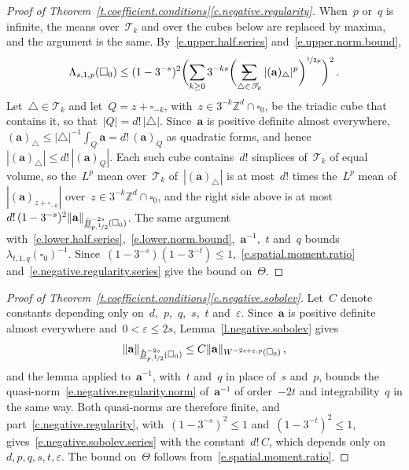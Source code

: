 \documentclass[11pt,letterpaper]{article}
\makeatletter
\numberwithin{equation}{section}
\theoremstyle{definition}
\newcommand{\Zd}{\mathbb{Z}^d}
\renewcommand{\a}{\mathbf{a}}
\newcommand{\eps}{\varepsilon}
\newcommand{\nf}{\nicefrac}
\newcommand{\cu}{\square}
\DeclarePairedDelimiter{\norm}{\lVert}{\rVert}
\newcommand{\avsum}{\mathop{\mathpalette\avsuminner\relax}\displaylimits}
\newcommand\avsuminner[2]{%
	{\sbox0{$\m@th#1\sum$}%
		\vphantom{\usebox0}%
		\ooalign{%
			\hidewidth
			\smash{\,\rule[.23em]{8.8pt}{1.1pt} \relax}%
			\hidewidth\cr
			$\m@th#1\sum$\cr
		}%
	}%
}
\makeatother
\begin{document}
\begin{proof}[Proof of Theorem~\ref{t.coefficient.conditions}\ref{c.negative.regularity}]
When~$p$ or~$q$ is infinite, the means over~$\mathscr T_k$ and over the cubes below are replaced by maxima, and the argument is the same. By~\eqref{e.upper.half.series} and~\eqref{e.upper.norm.bound},
\begin{equation*}
	\Lambda_{s,1,p}(\cu_0)\leq(1-3^{-s})^2\biggl(\sum_{k\geq0}3^{-ks}\biggl(\avsum_{\triangle\in\mathscr T_k}|(\a)_\triangle|^p\biggr)^{\nf1{2p}}\biggr)^2\,.
\end{equation*}
Let~$\triangle\in\mathscr T_k$ and let~$Q=z+\cu_{-k}$, with~$z\in3^{-k}\Zd\cap\cu_0$, be the triadic cube that contains it, so that~$|Q|=d!\,|\triangle|$. Since~$\a$ is positive definite almost everywhere,~$(\a)_\triangle\leq|\triangle|^{-1}\int_Q\a=d!\,(\a)_Q$ as quadratic forms, and hence~$|(\a)_\triangle|\leq d!\,|(\a)_Q|$. Each such cube contains~$d!$ simplices of~$\mathscr T_k$ of equal volume, so the~$L^p$ mean over~$\mathscr T_k$ of~$|(\a)_\triangle|$ is at most~$d!$ times the~$L^p$ mean of~$|(\a)_{z+\cu_{-k}}|$ over~$z\in3^{-k}\Zd\cap\cu_0$, and the right side above is at most~$d!\,(1-3^{-s})^2\norm{\a}_{\mathring{\underline B}^{-2s}_{p,\nf12}(\cu_0)}$. The same argument with~\eqref{e.lower.half.series},~\eqref{e.lower.norm.bound},~$\a^{-1}$,~$t$ and~$q$ bounds~$\lambda_{t,1,q}(\cu_0)^{-1}$. Since~$(1-3^{-s})(1-3^{-t})\leq1$,~\eqref{e.spatial.moment.ratio} and~\eqref{e.negative.regularity.series} give the bound on~$\Theta$.
\end{proof}

\begin{proof}[Proof of Theorem~\ref{t.coefficient.conditions}\ref{c.negative.sobolev}]
Let~$C$ denote constants depending only on~$d$,~$p$,~$q$,~$s$,~$t$ and~$\eps$. Since~$\a$ is positive definite almost everywhere and~$0<\eps\leq2s$, Lemma~\ref{l.negative.sobolev} gives
\begin{equation*}
	\norm{\a}_{\mathring{\underline B}^{-2s}_{p,\nf12}(\cu_0)}\leq C\norm{\a}_{W^{-2s+\eps,p}(\cu_0)}\,,
\end{equation*}
and the lemma applied to~$\a^{-1}$, with~$t$ and~$q$ in place of~$s$ and~$p$, bounds the quasi-norm~\eqref{e.negative.regularity.norm} of~$\a^{-1}$ of order~$-2t$ and integrability~$q$ in the same way. Both quasi-norms are therefore finite, and part~\ref{c.negative.regularity}, with~$(1-3^{-s})^2\leq1$ and~$(1-3^{-t})^2\leq1$, gives~\eqref{e.negative.sobolev.series} with the constant~$d!\,C$, which depends only on~$d,p,q,s,t,\eps$. The bound on~$\Theta$ follows from~\eqref{e.spatial.moment.ratio}.
\end{proof}
\end{document}
